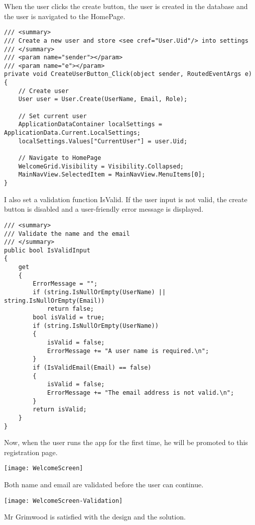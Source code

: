 \documentclass[report.tex]{subfiles}
\begin{document}
When the user clicks the create button, the user is created in the database and the user is navigated to the HomePage.

\begin{verbatim}
/// <summary>
/// Create a new user and store <see cref="User.Uid"/> into settings
/// </summary>
/// <param name="sender"></param>
/// <param name="e"></param>
private void CreateUserButton_Click(object sender, RoutedEventArgs e)
{
    // Create user
    User user = User.Create(UserName, Email, Role);

    // Set current user
    ApplicationDataContainer localSettings = ApplicationData.Current.LocalSettings;
    localSettings.Values["CurrentUser"] = user.Uid;

    // Navigate to HomePage
    WelcomeGrid.Visibility = Visibility.Collapsed;
    MainNavView.SelectedItem = MainNavView.MenuItems[0];
}
\end{verbatim}

I also set a validation function IsValid. If the user input is not valid, the create button is disabled and a user-friendly error message is displayed.

\begin{verbatim}
/// <summary>
/// Validate the name and the email
/// </summary>
public bool IsValidInput
{
    get
    {
        ErrorMessage = "";
        if (string.IsNullOrEmpty(UserName) || string.IsNullOrEmpty(Email)) 
            return false;
        bool isValid = true;
        if (string.IsNullOrEmpty(UserName))
        {
            isValid = false;
            ErrorMessage += "A user name is required.\n";
        }
        if (IsValidEmail(Email) == false)
        {
            isValid = false;
            ErrorMessage += "The email address is not valid.\n";
        }
        return isValid;
    }
}
\end{verbatim}

Now, when the user runs the app for the first time, he will be promoted to this registration page.

\texttt{[image: WelcomeScreen]}

Both name and email are validated before the user can continue.

\texttt{[image: WelcomeScreen-Validation]}

Mr Grimwood is satisfied with the design and the solution.
\end{document}

